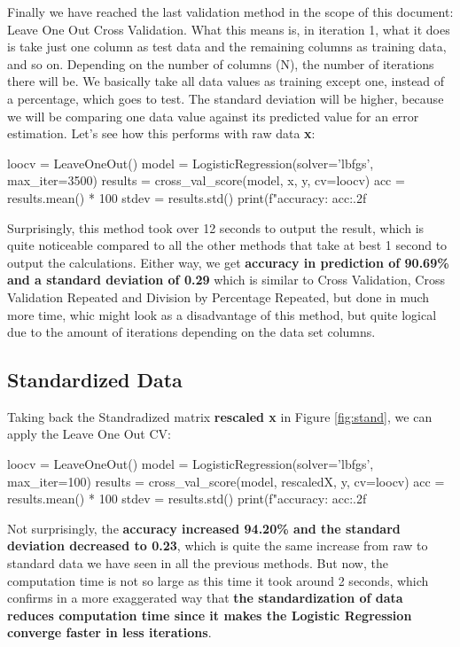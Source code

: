 \documentclass[11pt]{article}
\begin{document}
Finally we have reached the last validation method in the scope of this document: Leave One Out Cross Validation. What this means is, in iteration 1, what it does is take just one column as test data and the remaining columns as training data, and so on. Depending on the number of columns (N), the number of iterations there will be. We basically take all data values as training except one, instead of a percentage, which goes to test. The standard deviation will be higher, because we will be comparing one data value against its predicted value for an error estimation. Let's see how this performs with raw data \textbf{x}:
\\

\begin{python}
loocv = LeaveOneOut()
model = LogisticRegression(solver='lbfgs', max_iter=3500)
results = cross_val_score(model, x, y, cv=loocv)
acc = results.mean() * 100
stdev = results.std()
print(f"accuracy: {acc:.2f}%
\end{python}

Surprisingly, this method took over 12 seconds to output the result, which is quite noticeable compared to all the other methods that take at best 1 second to output the calculations. Either way, we get \textbf{accuracy in prediction of 90.69\% and a standard deviation of 0.29} which is similar to Cross Validation, Cross Validation Repeated and Division by Percentage Repeated, but done in much more time, whic might look as a disadvantage of this method, but quite logical due to the amount of iterations depending on the data set columns.

\subsection{Standardized Data}

Taking back the Standradized matrix \textbf{rescaled x} in Figure \ref{fig:stand}, we can apply the Leave One Out CV:
\\

\begin{python}
loocv = LeaveOneOut()
model = LogisticRegression(solver='lbfgs', max_iter=100)
results = cross_val_score(model, rescaledX, y, cv=loocv)
acc = results.mean() * 100
stdev = results.std()
print(f"accuracy: {acc:.2f}%
\end{python}

Not surprisingly, the \textbf{accuracy increased 94.20\% and the standard deviation decreased to 0.23}, which is quite the same increase from raw to standard data we have seen in all the previous methods. But now, the computation time is not so large as this time it took around 2 seconds, which confirms in a more exaggerated way that \textbf{the standardization of data reduces computation time since it makes the Logistic Regression converge faster in less iterations}.
\end{document}
